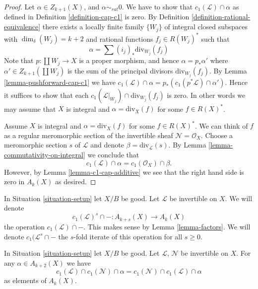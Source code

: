 \begin{proof}
Let $\alpha \in Z_{k + 1}(X)$, and $\alpha \sim_{rat} 0$.
We have to show that $c_1(\mathcal{L}) \cap \alpha$
as defined in Definition \ref{definition-cap-c1} is zero.
By Definition \ref{definition-rational-equivalence} there
exists a locally finite family $\{W_j\}$ of integral closed
subspaces with $\dim_\delta(W_j) = k + 2$ and rational functions
$f_j \in R(W_j)^*$ such that
$$
\alpha = \sum (i_j)_*\text{div}_{W_j}(f_j)
$$
Note that $p : \coprod W_j \to X$ is a proper morphism,
and hence $\alpha = p_*\alpha'$ where $\alpha' \in Z_{k + 1}(\coprod W_j)$
is the sum of the principal divisors $\text{div}_{W_j}(f_j)$.
By Lemma \ref{lemma-pushforward-cap-c1} we have
$c_1(\mathcal{L}) \cap \alpha = p_*(c_1(p^*\mathcal{L}) \cap \alpha')$.
Hence it suffices to show that each
$c_1(\mathcal{L}|_{W_j}) \cap \text{div}_{W_j}(f_j)$ is zero.
In other words we may assume that $X$ is integral and
$\alpha = \text{div}_X(f)$ for some $f \in R(X)^*$.

\medskip\noindent
Assume $X$ is integral and $\alpha = \text{div}_X(f)$ for some $f \in R(X)^*$.
We can think of $f$ as a regular meromorphic section of the invertible
sheaf $\mathcal{N} = \mathcal{O}_X$. Choose a meromorphic section
$s$ of $\mathcal{L}$ and denote $\beta = \text{div}_\mathcal{L}(s)$.
By Lemma \ref{lemma-commutativity-on-integral}
we conclude that
$$
c_1(\mathcal{L}) \cap \alpha = c_1(\mathcal{O}_X) \cap \beta.
$$
However, by Lemma \ref{lemma-c1-cap-additive} we see that the right hand side
is zero in $A_k(X)$ as desired.
\end{proof}

\noindent
In Situation \ref{situation-setup} let $X/B$ be good.
Let $\mathcal{L}$ be invertible on $X$.
We will denote
$$
c_1(\mathcal{L})^s \cap - : A_{k + s}(X) \to A_k(X)
$$
the operation $c_1(\mathcal{L}) \cap - $. This makes sense by
Lemma \ref{lemma-factors}. We will denote $c_1(\mathcal{L}^s \cap -$
the $s$-fold iterate of this operation for all $s \geq 0$.

\begin{lemma}
\label{lemma-cap-commutative}
In Situation \ref{situation-setup} let $X/B$ be good.
Let $\mathcal{L}$, $\mathcal{N}$ be invertible on $X$.
For any $\alpha \in A_{k + 2}(X)$ we have
$$
c_1(\mathcal{L}) \cap c_1(\mathcal{N}) \cap \alpha
=
c_1(\mathcal{N}) \cap c_1(\mathcal{L}) \cap \alpha
$$
as elements of $A_k(X)$.
\end{lemma}

